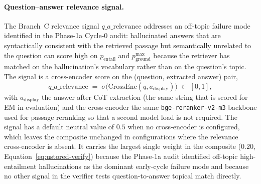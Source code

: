 \paragraph{Question--answer relevance signal.}
The Branch~C relevance signal $q\_a\_\text{relevance}$ addresses an off-topic failure mode identified in the Phase-1a Cycle-0 audit: hallucinated answers that are syntactically consistent with the retrieved passage but semantically unrelated to the question can score high on $p_{\text{entail}}$ and $p_{\text{ground}}^{\max}$ because the retriever has matched on the hallucination's vocabulary rather than on the question's topic. The signal is a cross-encoder score on the (question, extracted answer) pair,
\begin{equation}
q\_a\_\text{relevance} \;=\; \sigma\bigl(\mathrm{CrossEnc}(q, a_{\text{display}})\bigr) \;\in\; [0, 1],
\label{eq:qarel}
\end{equation}
with $a_{\text{display}}$ the answer after CoT extraction (the same string that is scored for EM in evaluation) and the cross-encoder the same \texttt{bge-reranker-v2-m3} backbone used for passage reranking so that a second model load is not required. The signal has a default neutral value of $0.5$ when no cross-encoder is configured, which leaves the composite unchanged in configurations where the relevance cross-encoder is absent. It carries the largest single weight in the composite ($0.20$, Equation~\ref{eq:ustored-verify}) because the Phase-1a audit identified off-topic high-entailment hallucinations as the dominant early-cycle failure mode and because no other signal in the verifier tests question-to-answer topical match directly.

